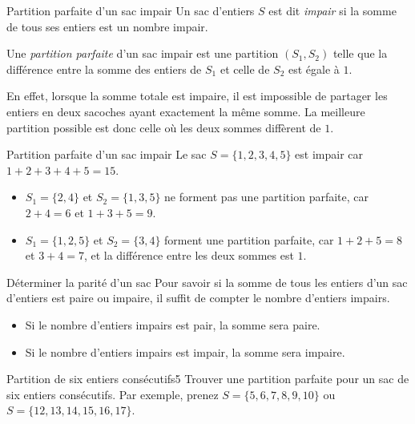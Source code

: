\documentclass[a4paper,twoside]{article}
\begin{document}
  \begin{definition}{Partition parfaite d'un sac impair}
    Un sac d'entiers $S$ est dit \emph{impair} si la somme de tous ses entiers est un nombre impair.

    Une \emph{partition parfaite} d'un sac impair est une partition $(S_1,S_2)$ telle que
    la différence entre la somme des entiers de $S_1$ et celle de $S_2$ est égale à $1$.
  \end{definition}

  En effet, lorsque la somme totale est impaire, il est impossible de partager les
  entiers en deux sacoches ayant exactement la même somme. La meilleure partition
  possible est donc celle où les deux sommes diffèrent de $1$.


  \begin{exemple}{Partition parfaite d'un sac impair}
    Le sac $S = \{1,2,3,4,5\}$ est impair car $1+2+3+4+5 = 15$.
    \begin{itemize}
    \item $S_1 = \{2,4\}$ et $S_2 = \{1,3,5\}$ ne forment pas une partition parfaite,
      car $2 + 4 = 6$ et $1 + 3 + 5 = 9$.

    \item $S_1 = \{1,2,5\}$ et $S_2 = \{3,4\}$ forment une partition parfaite,
      car $1 + 2 + 5 = 8$ et $3 + 4 = 7$, et la différence entre les deux sommes est $1$.
    \end{itemize}
  \end{exemple}

  \begin{remarque}{Déterminer la parité d'un sac}
    Pour savoir si la somme de tous les entiers d'un sac d'entiers est paire ou impaire, il suffit de compter le nombre d'entiers impairs.
    \begin{itemize}
    \item Si le nombre d'entiers impairs est pair, la somme sera paire.
    \item Si le nombre d'entiers impairs est impair, la somme sera impaire.
    \end{itemize}
  \end{remarque}


  \begin{exercice}{Partition de six entiers consécutifs}{5}
    Trouver une partition parfaite pour un sac de six entiers consécutifs.
    Par exemple, prenez $S = \{5, 6, 7, 8, 9, 10\}$ ou $S = \{12, 13, 14, 15, 16, 17\}$.
  \end{exercice}
\end{document}
